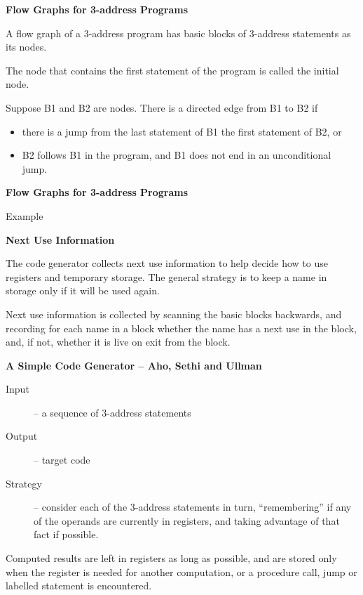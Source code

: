 %
%
\begin{slide}{}
{\bf Flow Graphs for 3-address Programs}

A flow graph of a 3-address program has basic
blocks of 3-address statements as its nodes.

The node that contains the first statement of
the program is called the initial node.

Suppose B1 and B2 are nodes.  There is a directed
edge from B1 to B2 if
\begin{itemize}
\item there is a jump from the last statement of B1
      the first statement of B2, or
\item B2 follows B1 in the program, and B1 does not
      end in an unconditional jump.
\end{itemize}
\end{slide}
%
%
\begin{slide}{}
{\bf Flow Graphs for 3-address Programs}

Example

\vspace{3ex}

\end{slide}
%
%
\begin{slide}{}
{\bf Next Use Information}

The code generator collects next use information
to help decide how to use registers and temporary
storage.  The general strategy is to keep a name
in storage only if it will be used again.

Next use information is collected by scanning the
basic blocks backwards, and recording for each name
in a block whether the name has a next use in the
block, and, if not, whether it is live on exit from
the block.
\end{slide}
%
%
\begin{slide}{}
{\bf A Simple Code Generator -- Aho, Sethi and Ullman}

\begin{description}
\item[Input] -- a sequence of 3-address statements
\item[Output] -- target code
\item[Strategy] -- consider each of the 3-address
    statements in turn, ``remembering'' if any of the
    operands are currently in registers, and taking
    advantage of that fact if possible.
\end{description}

Computed results are left in registers as long as possible,
and are stored only when the register is needed for another
computation, or a procedure call, jump or labelled statement
is encountered.
\end{slide}
